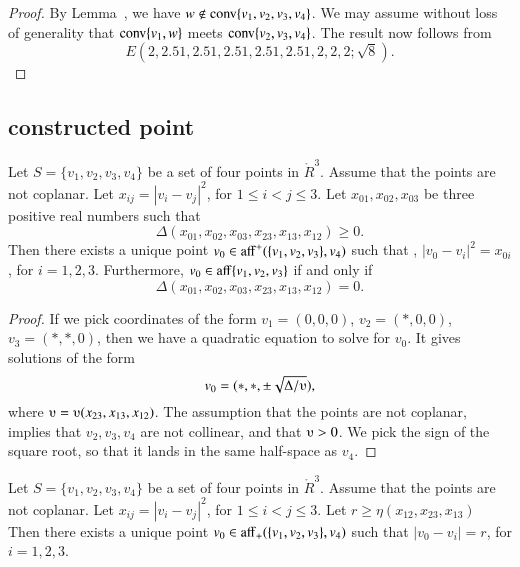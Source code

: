 \begin{proof}
By Lemma~, we have $w\not\in{\operatorname{conv}}\{v_1,v_2,v_3,v_4\}$.
We may assume without loss of generality that
${\operatorname{conv}}\{v_1,w\}$ meets ${\operatorname{conv}}\{v_2,v_3,v_4\}$.  The result
now follows from
    $$
    E(2,2.51,2.51,2.51,2.51,2.51,2,2,2;  \sqrt{8}).
    $$
\end{proof}

\newpage

\subsection{constructed point}

\begin{lemma}
Let $S=\{v_1,v_2,v_3,v_4\}$ be a set of four points
in $\ring{R}^3$.  Assume that the points are not coplanar.
Let $x_{ij} = |v_i-v_j|^2$, for $1\le i < j\le 3$.
Let $x_{01},x_{02},x_{03}$ be three positive real numbers such that
$$
  \Delta(x_{01},x_{02},x_{03},x_{23},x_{13},x_{12})\ge0.
$$
Then there exists a unique point $v_0\in{\operatorname{aff}}^+(\{v_1,v_2,v_3\},v_4)$
such that
,   $|v_0-v_i|^2 = x_{0i}$, for $i=1,2,3$.
Furthermore, $v_0\in{\operatorname{aff}}\{v_1,v_2,v_3\}$ if and only if 
 $$
  \Delta(x_{01},x_{02},x_{03},x_{23},x_{13},x_{12})=0.
$$
\end{lemma}

\begin{proof} If we pick coordinates of the form $v_1=(0,0,0)$,
$v_2=(*,0,0)$, $v_3=(*,*,0)$, then we have a quadratic equation to
solve for $v_0$.  It gives solutions of the form
   $$
   v_0 = (*,*,\pm\sqrt{\Delta/\ups}),
   $$
where $\ups = \ups(x_{23},x_{13},x_{12})$.  The assumption that the points
are not coplanar, implies that $v_2,v_3,v_4$ are not collinear, and that
$\ups>0$.  We pick the sign of the square root, so that it lands in the
same half-space as $v_4$.  
\end{proof}

\newpage

\begin{lemma}
Let $S=\{v_1,v_2,v_3,v_4\}$ be a set of four points
in $\ring{R}^3$.  Assume that the points are not coplanar.
Let $x_{ij} = |v_i-v_j|^2$, for $1\le i < j\le 3$.
Let $r\ge \eta(x_{12},x_{23},x_{13})$ 
Then there exists a unique point $v_0\in{\operatorname{aff}}_+(\{v_1,v_2,v_3\},v_4)$
such that
   $|v_0-v_i| = r$, for $i=1,2,3$.
\end{lemma}

